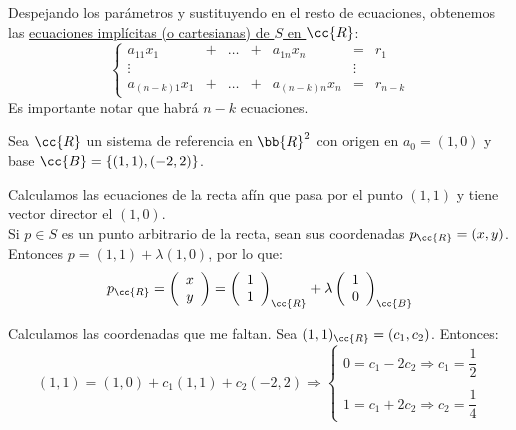 Despejando los parámetros y sustituyendo en el resto de ecuaciones, obtenemos las \ul{ecuaciones implícitas (o cartesianas) de $S$ en $\cc{R}$}:
\begin{equation*}
    \left\{
    \begin{array}{rcccrcl}
        a_{11}x_1 & + & \dots & + & a_{1n}x_n & = & r_1 \\
        \vdots&&&&& \vdots \\
        a_{(n-k)1}x_1 & + & \dots & + & a_{(n-k)n}x_n & = & r_{n-k}
    \end{array}
    \right.
\end{equation*}
Es importante notar que habrá $n-k$ ecuaciones.


\begin{ejemplo}
    Sea $\cc{R}$ un sistema de referencia en $\bb{R}^2$ con origen en $a_0=(1,0)$ y base $\cc{B}=\{(1,1), (-2,2)\}$.

    Calculamos las ecuaciones de la recta afín que pasa por el punto $(1,1)$ y tiene vector director el $(1,0)$.\\

    Si $p\in S$ es un punto arbitrario de la recta, sean sus coordenadas $p_{\cc{R}}=(x,y)$. Entonces $p=(1,1)+\lambda (1,0)$, por lo que:
    \begin{equation*}
        p_{\cc{R}}=
        \left(\begin{array}{c}
            x \\ y
        \end{array}\right)
        = \left(\begin{array}{c}
            1 \\ 1
        \end{array}\right)_{\cc{R}}
        +\lambda \left(\begin{array}{c}
            1 \\ 0
        \end{array}\right)_{\cc{B}}
    \end{equation*}

    Calculamos las coordenadas que me faltan. Sea $(1,1)_{\cc{R}}=(c_1,c_2)$. Entonces:
    \begin{equation*}
        (1,1)=(1,0) + c_1(1,1) + c_2(-2,2) \Longrightarrow
        \left\{
        \begin{array}{l}
            0 = c_1-2c_2\Longrightarrow c_1=\dfrac{1}{2}\\ \\
            1 = c_1 +2c_2 \Longrightarrow c_2=\dfrac{1}{4}
        \end{array}
        \right.
    \end{equation*}


\end{ejemplo}
